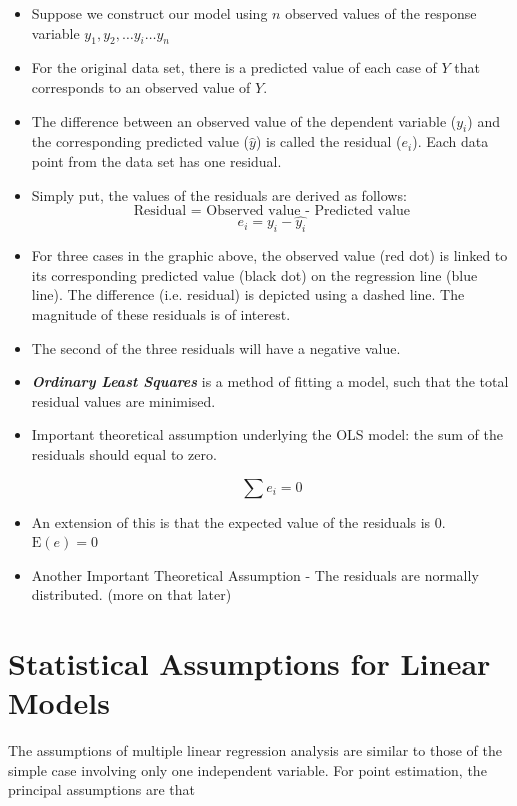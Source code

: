\documentclass[residuals.tex]{subfiles}
\begin{document}
\begin{itemize}
	\item Suppose we construct our model using $n$ observed values of the response variable $y_1, y_2, \ldots y_i \ldots y_n$
	
	\item For the original data set, there is a predicted value of each case of $Y$ that corresponds to an observed value of $Y$. 
	
	\item The difference between an observed value of the dependent variable ($y_i$) and the corresponding predicted value ($\hat{y}$) is called the residual ($e_i$). Each data point from the data set has one residual.
	
	\item Simply put, the values of the residuals are derived as follows: 
	\[\mbox{Residual = Observed value - Predicted value}\]
	\[e_i = y_i - \hat{y_i} \]
	\item For three cases in the graphic above, the observed value (red dot) is linked to its corresponding predicted value (black dot) on the regression line (blue line).
	The difference (i.e. residual) is depicted using a dashed line. The magnitude of these residuals is of interest.
	\item The second of the three residuals will have a negative value.
	\item \textbf{\textit{Ordinary Least Squares}} is a method of fitting a model, such that the total residual values are minimised.
	
	
	\item Important theoretical assumption underlying the OLS model: the sum of the residuals should equal to zero. 
	
	{
		\Large
		\[\sum e_i = 0\]
	}
	\item An extension of this is that the expected value of the residuals is 0. 
	$\mathrm{E}(e) = 0$
	\item Another Important Theoretical Assumption - The residuals are normally distributed. (more on that later)
\end{itemize}
\newpage
\section*{Statistical Assumptions for Linear Models}
The assumptions of multiple linear regression analysis are similar to those of the simple case involving only one independent variable. For point estimation, the principal assumptions are that
\end{document}

